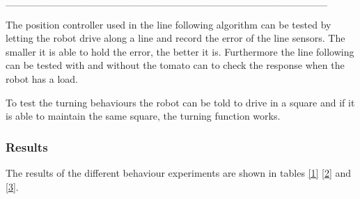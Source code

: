 \_\_\_\_\_\_\_\_\_\_\_\_\_\_\_\_\_\_\_\_\_\_\_\_\_\_\_\_\_\_\_\_\_\_\_\_\_\_\_\_\_\_\_\_

The position controller used in the line following algorithm can be tested by letting the robot drive along a line and record the error of the line sensors.
The smaller it is able to hold the error, the better it is.
Furthermore the line following can be tested with and without the tomato can to check the response when the robot has a load.

To test the turning behaviours the robot can be told to drive in a square and if it is able to maintain the same square, the turning function works.


\subsubsection{Results}

The results of the different behaviour experiments are shown in tables \ref{1} \ref{2} and \ref{3}.

